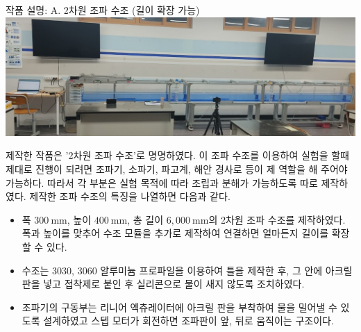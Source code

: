 \documentclass[Junlampaper, portrait]{Junlam_PosterK}
\begin{document}
\begin{poster}
\begin{posterbox}[name=wtank,span=2,column=1,row=0] {작품 설명: A. 2차원 조파 수조 (길이 확장 가능)}
        \includegraphics[width=\textwidth]{images/Experiment_System_Crop}
\newline
\scriptsize 제작한 작품은 '2차원 조파 수조'로 명명하였다. 이 조파 수조를 이용하여 실험을 할때 제대로 진행이 되려면 조파기, 소파기, 파고계, 해안 경사로 등이 제 역할을 해 주어야 가능하다. 따라서 각 부분은 실험 목적에 따라 조립과 분해가 가능하도록 따로 제작하였다. 제작한 조파 수조의 특징을 나열하면 다음과 같다.
\begin{itemize}
    \item 폭 $300~\mathrm{mm}$, 높이 $400~\mathrm{mm}$, 총 길이 $6,000~\mathrm{mm}$의 2차원 조파 수조를 제작하였다. 폭과 높이를 맞추어 수조 모듈을 추가로 제작하여 연결하면 얼마든지 길이를 확장할 수 있다.
    \item 수조는 3030, 3060 알루미늄 프로파일을 이용하여 틀을 제작한 후, 그 안에 아크릴 판을 넣고 접착제로 붙인 후 실리콘으로 물이 새지 않도록 조치하였다.  
    \item 조파기의 구동부는 리니어 엑츄레이터에 아크릴 판을 부착하여 물을 밀어낼 수 있도록 설계하였고 스텝 모터가 회전하면 조파판이 앞, 뒤로 움직이는 구조이다.

\end{itemize}
\end{posterbox}
\end{poster}
\end{document}
